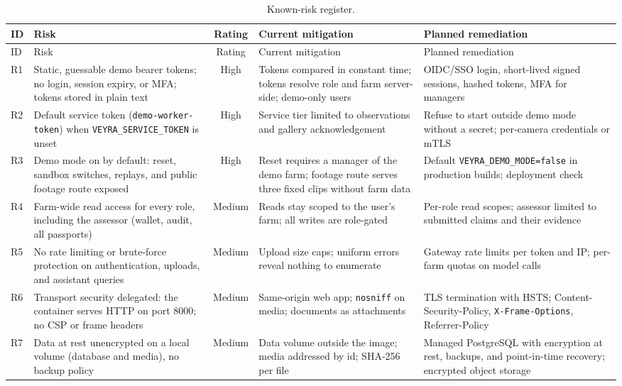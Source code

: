 \documentclass[11pt,letterpaper]{article}
\newcommand{\high}{\cellcolor{red!18}High}
\newcommand{\med}{\cellcolor{orange!22}Medium}
\begin{document}
{\footnotesize
\setlength{\tabcolsep}{3.5pt}
\begin{longtable}{>{\raggedright\arraybackslash}p{0.7cm}>{\raggedright\arraybackslash}p{3.3cm}c>{\raggedright\arraybackslash}p{4.3cm}>{\raggedright\arraybackslash}p{4.6cm}}
\caption{Known-risk register.}\label{tab:risks}\\
\toprule
ID & Risk & Rating & Current mitigation & Planned remediation \\
\midrule
\endfirsthead
\toprule
ID & Risk & Rating & Current mitigation & Planned remediation \\
\midrule
\endhead
\bottomrule
\endfoot
R1 & Static, guessable demo bearer tokens; no login, session expiry, or MFA; tokens stored in plain text & \high & Tokens compared in constant time; tokens resolve role and farm server-side; demo-only users & OIDC/SSO login, short-lived signed sessions, hashed tokens, MFA for managers \\
R2 & Default service token (\texttt{demo-worker-token}) when \texttt{VEYRA\_SERVICE\_TOKEN} is unset & \high & Service tier limited to observations and gallery acknowledgement & Refuse to start outside demo mode without a secret; per-camera credentials or mTLS \\
R3 & Demo mode on by default: reset, sandbox switches, replays, and public footage route exposed & \high & Reset requires a manager of the demo farm; footage route serves three fixed clips without farm data & Default \texttt{VEYRA\_DEMO\_MODE=false} in production builds; deployment check \\
R4 & Farm-wide read access for every role, including the assessor (wallet, audit, all passports) & \med & Reads stay scoped to the user's farm; all writes are role-gated & Per-role read scopes; assessor limited to submitted claims and their evidence \\
R5 & No rate limiting or brute-force protection on authentication, uploads, and assistant queries & \med & Upload size caps; uniform errors reveal nothing to enumerate & Gateway rate limits per token and IP; per-farm quotas on model calls \\
R6 & Transport security delegated: the container serves HTTP on port 8000; no CSP or frame headers & \med & Same-origin web app; \texttt{nosniff} on media; documents as attachments & TLS termination with HSTS; Content-Security-Policy, \texttt{X-Frame-Options}, Referrer-Policy \\
R7 & Data at rest unencrypted on a local volume (database and media), no backup policy & \med & Data volume outside the image; media addressed by id; SHA-256 per file & Managed PostgreSQL with encryption at rest, backups, and point-in-time recovery; encrypted object storage \\

\end{longtable}}
\end{document}
